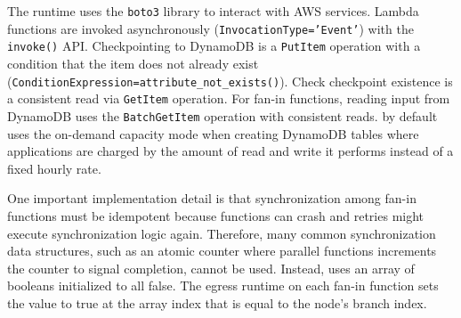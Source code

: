 The runtime uses the \texttt{boto3} library to interact with AWS services.
Lambda functions are invoked asynchronously (\texttt{InvocationType='Event'})
with the \texttt{invoke()} API. Checkpointing to DynamoDB is a
\texttt{PutItem} operation with a condition that the item does not already
exist (\texttt{ConditionExpression=attribute\_not\_exists()}). Check
checkpoint existence is a consistent read via \texttt{GetItem} operation. For
fan-in functions, reading input from DynamoDB uses the \texttt{BatchGetItem}
operation with consistent reads.
\name{} by default uses the on-demand capacity mode when creating DynamoDB
tables where applications are charged by the amount of read and write it
performs instead of a fixed hourly rate.

One important implementation detail is that synchronization among fan-in
functions must be idempotent because functions can crash and retries might
execute synchronization logic again. Therefore, many common synchronization
data structures, such as an atomic counter where parallel functions increments
the counter to signal completion, cannot be used. Instead, \name{} uses an
array of booleans initialized to all false. The egress runtime on each fan-in
function sets the value to true at the array index that is equal to the node's
branch index.
